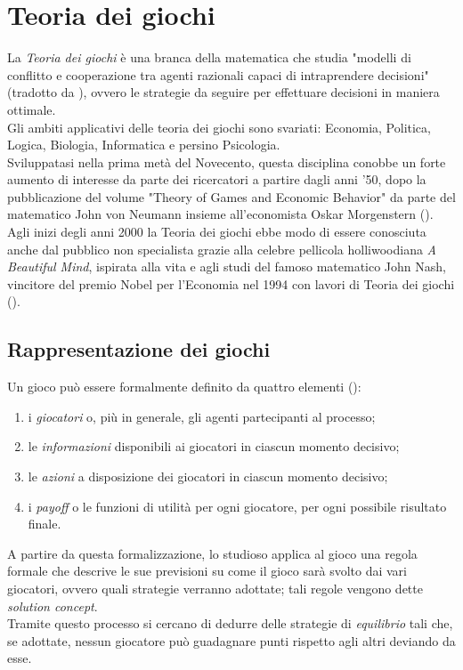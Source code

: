 \section{Teoria dei giochi}

La \emph{Teoria dei giochi} è una branca della matematica che studia "modelli di conflitto e cooperazione tra agenti razionali capaci di intraprendere decisioni" (tradotto da \cite{gtheory}), ovvero le strategie da seguire per effettuare decisioni in maniera ottimale.\\
Gli ambiti applicativi delle teoria dei giochi sono svariati: Economia, Politica, Logica, Biologia, Informatica e persino Psicologia.\\
Sviluppatasi nella prima metà del Novecento, questa disciplina conobbe un forte aumento di interesse da parte dei ricercatori a partire dagli anni '50, dopo la pubblicazione del volume "Theory of Games and Economic Behavior" da parte del matematico John von Neumann insieme all'economista Oskar Morgenstern (\cite{tog}). Agli inizi degli anni 2000 la Teoria dei giochi ebbe modo di essere conosciuta anche dal pubblico non specialista grazie alla celebre pellicola holliwoodiana \emph{A Beautiful Mind}, ispirata alla vita e agli studi del famoso matematico John Nash, vincitore del premio Nobel per l'Economia nel 1994 con lavori di Teoria dei giochi (\cite{jnash}).


\subsection{Rappresentazione dei giochi}

Un gioco può essere formalmente definito da quattro elementi (\cite{ramusen}):
\begin{enumerate}
   \item i \emph{giocatori} o, più in generale, gli agenti partecipanti al processo;
   \item le \emph{informazioni} disponibili ai giocatori in ciascun momento decisivo;
   \item le \emph{azioni} a disposizione dei giocatori in ciascun momento decisivo;
   \item i \emph{payoff} o le funzioni di utilità per ogni giocatore, per ogni possibile risultato finale.   
\end{enumerate}

A partire da questa formalizzazione, lo studioso applica al gioco una regola formale che descrive le sue previsioni su come il gioco sarà svolto dai vari giocatori, ovvero quali strategie verranno adottate; tali regole vengono dette \emph{solution concept}.\\
Tramite questo processo si cercano di dedurre delle strategie di \emph{equilibrio} tali che, se adottate, nessun giocatore può guadagnare punti rispetto agli altri deviando da esse.



